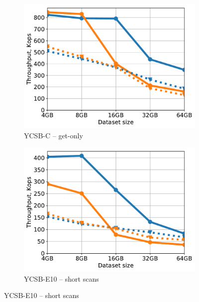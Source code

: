 \begin{figure}[tb]
\begin{subfigure}{0.33\linewidth}
\includegraphics[width=\textwidth]{figs/Workload_C_line.pdf}
\caption{YCSB-C -- get-only}
\label{fig:throughput:c}
\end{subfigure}
\begin{subfigure}{0.33\linewidth}
\includegraphics[width=\textwidth]{figs/Workload_E-_line.pdf}
\caption{YCSB-E10 -- short scans}

\end{subfigure}
\end{figure}
